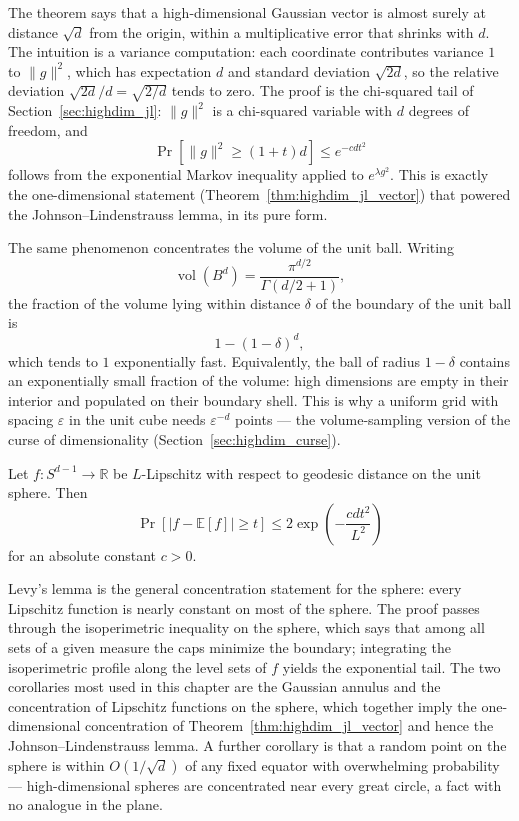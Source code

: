 The theorem says that a high-dimensional Gaussian vector is almost surely at
distance $\sqrt{d}$ from the origin, within a multiplicative error that
shrinks with $d$. The intuition is a variance computation: each coordinate
contributes variance $1$ to $\|g\|^2$, which has expectation $d$ and standard
deviation $\sqrt{2d}$, so the relative deviation $\sqrt{2d}/d = \sqrt{2/d}$
tends to zero. The proof is the chi-squared tail of
Section~\ref{sec:highdim_jl}: $\|g\|^2$ is a chi-squared variable with $d$
degrees of freedom, and
\[
\Pr\left[ \|g\|^2 \ge (1+t)d \right] \le e^{-c d t^2}
\]
follows from the exponential Markov inequality applied to
$e^{\lambda g^2}$. This is exactly the one-dimensional statement
(Theorem~\ref{thm:highdim_jl_vector}) that powered the
Johnson--Lindenstrauss lemma, in its pure form.

The same phenomenon concentrates the volume of the unit ball. Writing
\[
\operatorname{vol}(B^d) = \frac{\pi^{d/2}}{\Gamma(d/2 + 1)},
\]
the fraction of the volume lying within distance $\delta$ of the boundary of
the unit ball is
\[
1 - (1 - \delta)^d,
\]
which tends to $1$ exponentially fast. Equivalently, the ball of radius
$1 - \delta$ contains an exponentially small fraction of the volume: high
dimensions are empty in their interior and populated on their boundary shell.
This is why a uniform grid with spacing $\varepsilon$ in the unit cube needs
$\varepsilon^{-d}$ points --- the volume-sampling version of the curse of
dimensionality (Section~\ref{sec:highdim_curse}).

\begin{theorem}
\label{thm:highdim_levy}
Let $f: S^{d-1} \to \mathbb{R}$ be $L$-Lipschitz with respect to geodesic
distance on the unit sphere. Then
\[
\Pr\left[ |f - \mathbb{E}[f]| \ge t \right] \le 2 \exp\left( - \frac{c d t^2}{L^2} \right)
\]
for an absolute constant $c > 0$.
\end{theorem}

Levy's lemma is the general concentration statement for the sphere: every
Lipschitz function is nearly constant on most of the sphere. The proof passes
through the isoperimetric inequality on the sphere, which says that among all
sets of a given measure the caps minimize the boundary; integrating the
isoperimetric profile along the level sets of $f$ yields the exponential
tail. The two corollaries most used in this chapter are the Gaussian annulus
and the concentration of Lipschitz functions on the sphere, which together
imply the one-dimensional concentration of
Theorem~\ref{thm:highdim_jl_vector} and hence the Johnson--Lindenstrauss
lemma. A further corollary is that a random point on the sphere is within
$O(1/\sqrt{d})$ of any fixed equator with overwhelming probability ---
high-dimensional spheres are concentrated near every great circle, a fact
with no analogue in the plane.

